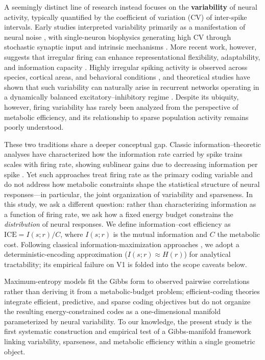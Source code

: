 \documentclass[sn-basic,Numbered]{sn-jnl}%
\theoremstyle{thmstyleone}%
\theoremstyle{thmstyletwo}%
\theoremstyle{thmstylethree}%
\begin{document}
A seemingly distinct line of research instead focuses on the \textbf{variability} of neural activity, typically quantified by the coefficient of variation (CV) of inter-spike intervals. Early studies interpreted variability primarily as a manifestation of neural noise \cite{6,4}, with single-neuron biophysics generating high CV through stochastic synaptic input and intrinsic mechanisms \cite{26,27,28,39}. More recent work, however, suggests that irregular firing can enhance representational flexibility, adaptability, and information capacity \cite{7,8,9,5,47}. Highly irregular spiking activity is observed across species, cortical areas, and behavioral conditions \cite{10,11,12,Buracas1998}, and theoretical studies have shown that such variability can naturally arise in recurrent networks operating in a dynamically balanced excitatory--inhibitory regime \cite{Renart2010,LitwinKumar2012,41}. Despite its ubiquity, however, firing variability has rarely been analyzed from the perspective of metabolic efficiency, and its relationship to sparse population activity remains poorly understood.

These two traditions share a deeper conceptual gap. Classic information--theoretic analyses have characterized how the information rate carried by spike trains scales with firing rate, showing sublinear gains due to decreasing information per spike \cite{Rieke1997,Sterling2015}. Yet such approaches treat firing rate as the primary coding variable and do not address how metabolic constraints shape the statistical structure of neural responses---in particular, the joint organization of variability and sparseness. In this study, we ask a different question: rather than characterizing information as a function of firing rate, we ask how a fixed energy budget constrains the \emph{distribution} of neural responses. We define information--cost efficiency as $\mathrm{ICE} = I(s;r)/C$, where $I(s;r)$ is the mutual information and $C$ the metabolic cost. Following classical information-maximization approaches \cite{Laughlin1981,Bell1995Infomax,Yu2005VisionResearch}, we adopt a deterministic-encoding approximation ($I(s;r)\approx H(r)$) for analytical tractability; its empirical failure on V1 is folded into the scope caveats below.

Maximum-entropy models \cite{45} fit the Gibbs form to observed pairwise correlations rather than deriving it from a metabolic-budget problem; efficient-coding theories \cite{Chalk2018} integrate efficient, predictive, and sparse coding objectives but do not organize the resulting energy-constrained codes as a one-dimensional manifold parameterized by neural variability.  To our knowledge, the present study is the first systematic construction and empirical test of a Gibbs-manifold framework linking variability, sparseness, and metabolic efficiency within a single geometric object.
\end{document}
